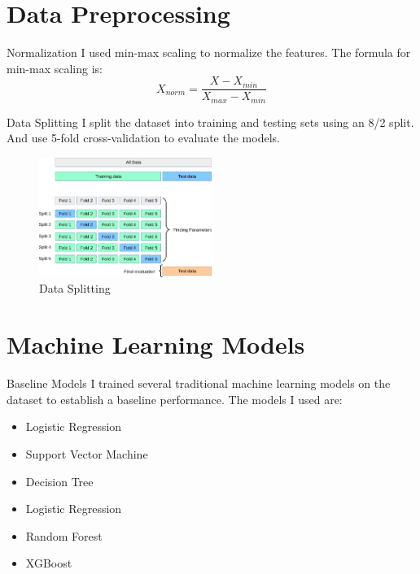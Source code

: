 \documentclass{beamer}
\begin{document}
\section{Data Preprocessing}
\begin{frame}{Normalization}
  I used min-max scaling to normalize the features. The formula for min-max scaling is:
  \[ X_{norm} = \frac{X - X_{min}}{X_{max} - X_{min}} \]
\end{frame}

\begin{frame}{Data Splitting}
  I split the dataset into training and testing sets using an 8/2 split. And use 5-fold cross-validation to evaluate the models.
  \begin{figure}
    \centering
    \includegraphics[width=0.5\textwidth]{images/grid_search_cross_validation.png}
    \caption{Data Splitting}
  \end{figure}
\end{frame}

\section{Machine Learning Models}
\begin{frame}{Baseline Models}
  I trained several traditional machine learning models on the dataset to establish a baseline performance. The models I used are:
  \begin{itemize}
    \item Logistic Regression
    \item Support Vector Machine
    \item  Decision Tree
    \item Logistic Regression
    \item Random Forest
    \item XGBoost
  \end{itemize}
\end{frame}
\end{document}
